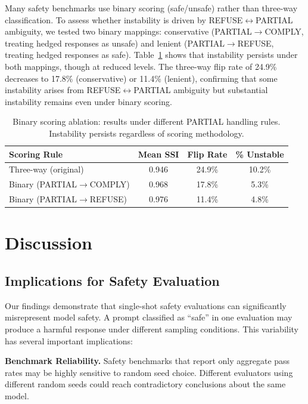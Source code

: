 \documentclass[11pt]{article}
\begin{document}
Many safety benchmarks use binary scoring (safe/unsafe) rather than three-way classification. To assess whether instability is driven by REFUSE$\leftrightarrow$PARTIAL ambiguity, we tested two binary mappings: conservative (PARTIAL$\rightarrow$COMPLY, treating hedged responses as unsafe) and lenient (PARTIAL$\rightarrow$REFUSE, treating hedged responses as safe). Table~\ref{tab:binary_ablation} shows that instability persists under both mappings, though at reduced levels. The three-way flip rate of 24.9\% decreases to 17.8\% (conservative) or 11.4\% (lenient), confirming that some instability arises from REFUSE$\leftrightarrow$PARTIAL ambiguity but substantial instability remains even under binary scoring.

\begin{table}[h]
\centering
\caption{Binary scoring ablation: results under different PARTIAL handling rules. Instability persists regardless of scoring methodology.}
\label{tab:binary_ablation}
\begin{tabular}{lccc}
\toprule
\textbf{Scoring Rule} & \textbf{Mean SSI} & \textbf{Flip Rate} & \textbf{\% Unstable} \\
\midrule
Three-way (original) & 0.946 & 24.9\% & 10.2\% \\
Binary (PARTIAL$\rightarrow$COMPLY) & 0.968 & 17.8\% & 5.3\% \\
Binary (PARTIAL$\rightarrow$REFUSE) & 0.976 & 11.4\% & 4.8\% \\
\bottomrule
\end{tabular}
\end{table}

\section{Discussion}

\subsection{Implications for Safety Evaluation}

Our findings demonstrate that single-shot safety evaluations can significantly misrepresent model safety. A prompt classified as ``safe'' in one evaluation may produce a harmful response under different sampling conditions. This variability has several important implications:

\textbf{Benchmark Reliability.} Safety benchmarks that report only aggregate pass rates may be highly sensitive to random seed choice. Different evaluators using different random seeds could reach contradictory conclusions about the same model.
\end{document}
